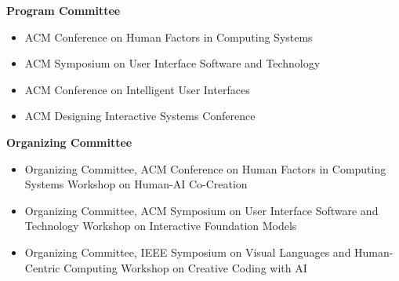 %
%
%


\textcolor{basecolor}{\textbf{Program Committee}}
\vspace{-2pt}

\begin{itemize}[leftmargin=1.4em]
  \item ACM Conference on Human Factors in Computing Systems 
  \item ACM Symposium on User Interface Software and Technology 
  \item ACM Conference on Intelligent User Interfaces 
  \item ACM Designing Interactive Systems Conference 
\end{itemize}
\vspace{4pt}

\textcolor{basecolor}{\textbf{Organizing Committee}}
\vspace{-2pt}

\begin{itemize}[leftmargin=1.4em]
  \item Organizing Committee, ACM Conference on Human Factors in Computing Systems Workshop on Human-AI Co-Creation 
  \item Organizing Committee, ACM Symposium on User Interface Software and Technology Workshop on Interactive Foundation Models 
  \item Organizing Committee, IEEE Symposium on Visual Languages and Human-Centric Computing Workshop on Creative Coding with AI 
\end{itemize}

\newcommand{\reviewCountMax}{16}  %
\newcommand{\reviewPointCount}{6}
\newcommand{\reviewXMin}{0.06}
\newcommand{\reviewXMax}{0.89}  %
\newcommand{\reviewSparkSpike}[2]{%
  {%
    \pgfmoveto{\pgforigin}%
    \pgfsetlinewidth{\sparkspikewidth}%
    \pgfsetstrokecolor{sparkspikecolor}%
    \pgfmoveto{\pgfxy(#1, 0)}%
    \pgflineto{\pgfxy(#1, #2)}%
    \pgfusepath{stroke}%
  }%
}
\newcommand{\reviewSpikeAt}[2]{%
  \edef\reviewX{\fpeval{\reviewXMin + ((#1-1) * (\reviewXMax-\reviewXMin) / (\reviewPointCount-1))}}%
  \edef\reviewHeight{\fpeval{#2/\reviewCountMax}}%
  \reviewSparkSpike{\reviewX}{\reviewHeight}%
}

